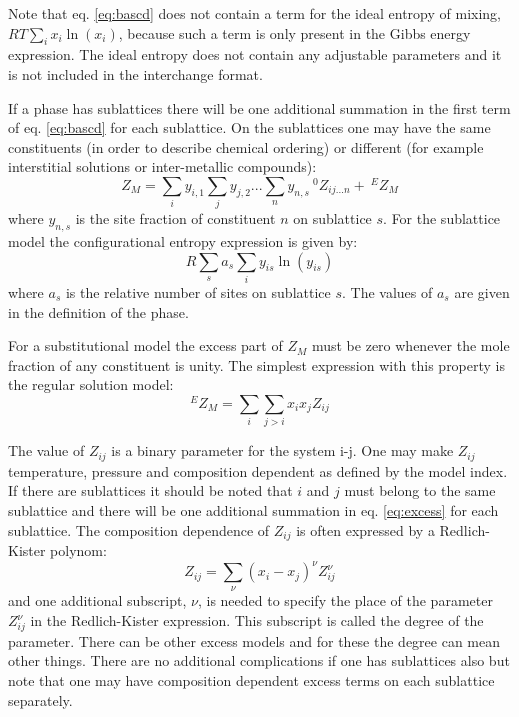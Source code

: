 \documentclass[12pt]{article}
\begin{document}
Note that eq.  \ref{eq:bascd} does not contain a term for the ideal
entropy of mixing, $RT\sum_i x_i\ln(x_i)$, because such a term is only
present in the Gibbs energy expression.  The ideal entropy does not
contain any adjustable parameters and it is not included in the
interchange format.

If a phase has sublattices there will be one additional summation in
the first term of eq.  \ref{eq:bascd} for each sublattice.  On the
sublattices one may have the same constituents (in order to describe
chemical ordering) or different (for example interstitial solutions or
inter-metallic compounds):
\begin{equation}
Z_M = \sum_i y_{i,1} \sum_j y_{j,2} ...  \sum_n y_{n,s} ~^0Z_{ij...n} + ~^EZ_M \label{eq:bassubl}
\end{equation}
where $y_{n,s}$ is the site fraction of constituent $n$ on sublattice
$s$.  For the sublattice model the configurational entropy expression
is given by:
\begin{equation}
R\sum_s a_s \sum_i y_{is} \ln(y_{is})
\end{equation}
where $a_s$ is the relative number of sites on sublattice $s$.   The
values of $a_s$ are given in the definition of the phase.

For a substitutional model the excess part of $Z_M$ must be zero
whenever the mole fraction of any constituent is unity.  The simplest
expression with this property is the regular solution model:
\begin{equation}
^EZ_M = \sum_i \sum_{j>i} x_i x_j Z_{ij} \label{eq:excess}
\end{equation}

The value of $Z_{ij}$ is a binary parameter for the system i-j.  One
may make $Z_{ij}$ temperature, pressure and composition dependent as
defined by the model index.  If there are sublattices it should be
noted that $i$ and $j$ must belong to the same sublattice and there
will be one additional summation in eq.  \ref{eq:excess} for each
sublattice.  The composition dependence of $Z_{ij}$ is often expressed
by a Redlich-Kister polynom:
\begin{equation}
Z_{ij} = \sum_{\nu} (x_i - x_j)^{\nu} Z_{ij}^{\nu} \label{eq:rk}
\end{equation}
and one additional subscript, $\nu$, is needed to specify the place of
the parameter $Z_{ij}^{\nu}$ in the Redlich-Kister expression.  This
subscript is called the degree of the parameter.  There can be other
excess models and for these the degree can mean other things.  There
are no additional complications if one has sublattices also but note
that one may have composition dependent excess terms on each
sublattice separately.
\end{document}
